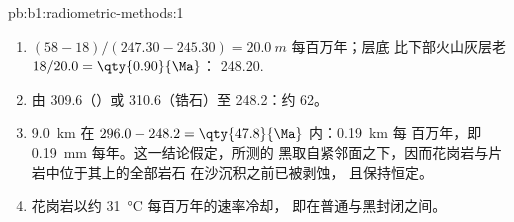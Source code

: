 \begin{solution}{pb:b1:radiometric-methods:1}
\begin{enumerate}
  \item $(58 - 18)/(247.30 - 245.30) = \qty{20.0}{m}$ 每百万年；层底
        比下部火山灰层老 $18/20.0 = \qty{0.90}{\Ma}$：
        \qty{248.20}{\Ma}.
  \item 由 \qty{309.6}{\Ma}（）或 \qty{310.6}{\Ma}（锆石）至
        \qty{248.2}{\Ma}：约 \qty{62}{\Ma}。
  \item \qty{9.0}{km} 在 $296.0 - 248.2 = \qty{47.8}{\Ma}$ 内：\qty{0.19}{km} 每
        百万年，即 \qty{0.19}{mm} 每年。这一结论假定，所测的
        黑取自紧邻面之下，因而花岗岩与片岩中位于其上的全部岩石
        在沙沉积之前已被剥蚀，
        且保持恒定。
  \item 花岗岩以约 \qty{31}{\celsius} 每百万年的速率冷却，
        即在普通与黑封闭之间。
\end{enumerate}
\end{solution}
